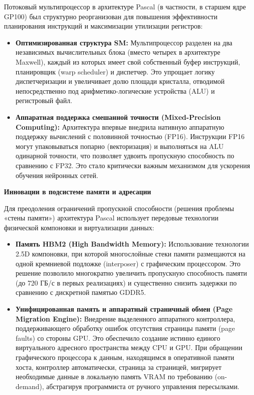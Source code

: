 \documentclass{article}[14pt]
\begin{document}
Потоковый мультипроцессор в архитектуре Pascal (в частности, в старшем ядре GP100) был структурно реорганизован для повышения эффективности планирования инструкций и максимизации утилизации регистров:
\begin{itemize}
    \item \textbf{Оптимизированная структура SM:} Мультипроцессор разделен на два независимых вычислительных блока (вместо четырех в архитектуре Maxwell), каждый из которых имеет свой собственный буфер инструкций, планировщик (warp scheduler) и диспетчер. Это упрощает логику диспетчеризации и увеличивает долю площади кристалла, отводимой непосредственно под арифметико-логические устройства (ALU) и регистровый файл.
    \item \textbf{Аппаратная поддержка смешанной точности (Mixed-Precision Computing):} Архитектура впервые внедрила нативную аппаратную поддержку вычислений с половинной точностью (FP16). Инструкции FP16 могут упаковываться попарно (векторизация) и выполняться на ALU одинарной точности, что позволяет удвоить пропускную способность по сравнению с FP32. Это стало критически важным механизмом для ускорения обучения нейронных сетей.
\end{itemize}

\medskip \noindent \textbf{Инновации в подсистеме памяти и адресации}

Для преодоления ограничений пропускной способности (решения проблемы «стены памяти») архитектура Pascal использует передовые технологии физической компоновки и виртуализации данных:
\begin{itemize}
    \item \textbf{Память HBM2 (High Bandwidth Memory):} Использование технологии 2.5D компоновки, при которой многослойные стеки памяти размещаются на одной кремниевой подложке (interposer) с графическим процессором. Это решение позволило многократно увеличить пропускную способность памяти (до 720 ГБ/с в первых реализациях) и существенно снизить задержки по сравнению с дискретной памятью GDDR5.
    \item \textbf{Унифицированная память и аппаратный страничный обмен (Page Migration Engine):} Внедрение выделенного аппаратного контроллера, поддерживающего обработку ошибок отсутствия страницы памяти (page faults) со стороны GPU. Это обеспечило создание истинно единого виртуального адресного пространства между CPU и GPU. При обращении графического процессора к данным, находящимся в оперативной памяти хоста, контроллер автоматически, страница за страницей, мигрирует необходимые данные в локальную память VRAM по требованию (on-demand), абстрагируя программиста от ручного управления пересылками.
\end{itemize}
\end{document}
